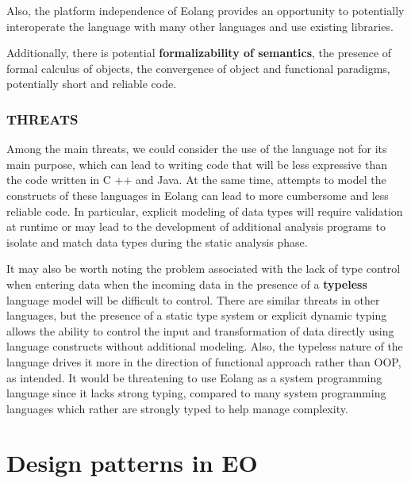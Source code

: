 \documentclass[12pt]{book}
\begin{document}
Also, the platform independence of Eolang provides an opportunity to potentially interoperate the language with many other languages and use existing libraries.

Additionally, there is potential \textbf{formalizability of semantics}, the presence of formal calculus of objects, the convergence of object and functional paradigms, potentially short and reliable code.

\subsection{THREATS}
Among the main threats, we could consider the use of the language not for its main purpose, which can lead to writing code that will be less expressive than the code written in C ++ and Java. At the same time, attempts to model the constructs of these languages in Eolang can lead to more cumbersome and less reliable code. In particular, explicit modeling of data types will require validation at runtime or may lead to the development of additional analysis programs to isolate and match data types during the static analysis phase.

It may also be worth noting the problem associated with the lack of type control when entering data when the incoming data in the presence of a \textbf{typeless} language model will be difficult to control. There are similar threats in other languages, but the presence of a static type system or explicit dynamic typing allows the ability to control the input and transformation of data directly using language constructs without additional modeling. Also, the typeless nature of the language drives it more in the direction of functional approach rather than OOP, as intended. It would be threatening to use Eolang as a system programming language since it lacks strong typing, compared to many system programming languages which rather are strongly typed to help
manage complexity.

\chapter{Design patterns in EO}
\end{document}
